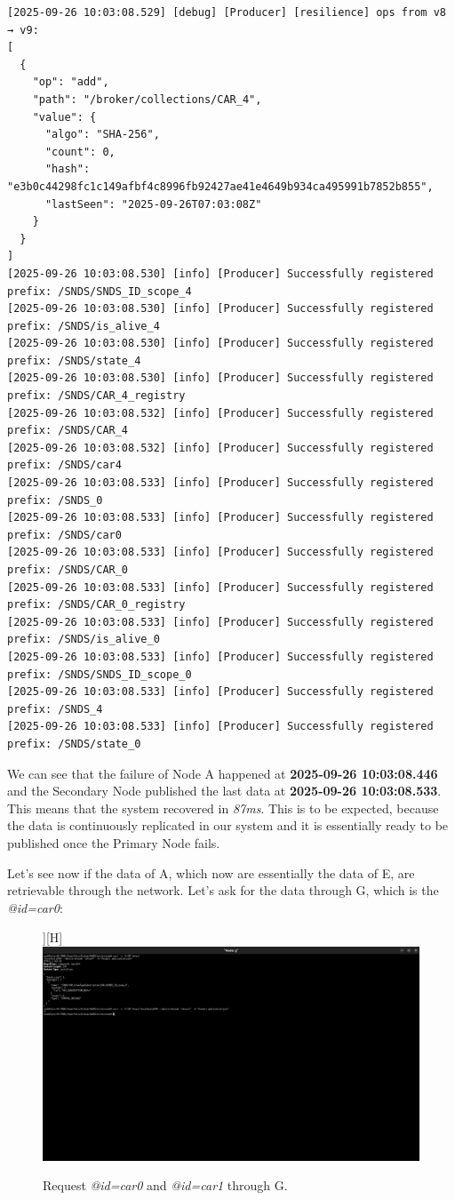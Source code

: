 \documentclass{article}
\begin{document}
\begin{lstlisting}[language=log, caption={E's recovery logs}, label={lst:e-recovery-logs}]
[2025-09-26 10:03:08.529] [debug] [Producer] [resilience] ops from v8 → v9:
[
  {
    "op": "add",
    "path": "/broker/collections/CAR_4",
    "value": {
      "algo": "SHA-256",
      "count": 0,
      "hash": "e3b0c44298fc1c149afbf4c8996fb92427ae41e4649b934ca495991b7852b855",
      "lastSeen": "2025-09-26T07:03:08Z"
    }
  }
]
[2025-09-26 10:03:08.530] [info] [Producer] Successfully registered prefix: /SNDS/SNDS_ID_scope_4
[2025-09-26 10:03:08.530] [info] [Producer] Successfully registered prefix: /SNDS/is_alive_4
[2025-09-26 10:03:08.530] [info] [Producer] Successfully registered prefix: /SNDS/state_4
[2025-09-26 10:03:08.530] [info] [Producer] Successfully registered prefix: /SNDS/CAR_4_registry
[2025-09-26 10:03:08.532] [info] [Producer] Successfully registered prefix: /SNDS/CAR_4
[2025-09-26 10:03:08.532] [info] [Producer] Successfully registered prefix: /SNDS/car4
[2025-09-26 10:03:08.533] [info] [Producer] Successfully registered prefix: /SNDS_0
[2025-09-26 10:03:08.533] [info] [Producer] Successfully registered prefix: /SNDS/car0
[2025-09-26 10:03:08.533] [info] [Producer] Successfully registered prefix: /SNDS/CAR_0
[2025-09-26 10:03:08.533] [info] [Producer] Successfully registered prefix: /SNDS/CAR_0_registry
[2025-09-26 10:03:08.533] [info] [Producer] Successfully registered prefix: /SNDS/is_alive_0
[2025-09-26 10:03:08.533] [info] [Producer] Successfully registered prefix: /SNDS/SNDS_ID_scope_0
[2025-09-26 10:03:08.533] [info] [Producer] Successfully registered prefix: /SNDS_4
[2025-09-26 10:03:08.533] [info] [Producer] Successfully registered prefix: /SNDS/state_0 
\end{lstlisting}

We can see that the failure of Node A happened at \textbf{2025-09-26 10:03:08.446} and the Secondary Node published the last data at \textbf{2025-09-26 10:03:08.533}. This means that the system recovered in \emph{87ms}. This is to be expected, because the data is continuously replicated in our system and it is essentially ready to be published once the Primary Node fails.

Let's see now if the data of A, which now are essentially the data of E, are retrievable through the network. Let's ask for the data through G, which is the \textit{@id=car0}:

\begin{figure}][H]
    \centering
    \includegraphics[width=0.5\linewidth]{images/after_failure_through_g.png}
    \caption{Request \textit{@id=car0} and \textit{@id=car1} through G.}
    \label{fig:placeholder}
\end{figure}
\end{document}
